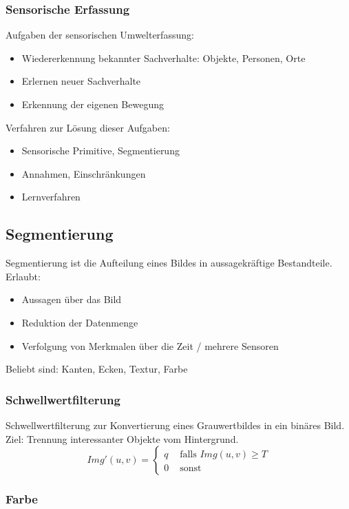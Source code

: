 \subsubsection*{Sensorische Erfassung}

Aufgaben der sensorischen Umwelterfassung:
\begin{itemize}
\item Wiedererkennung bekannter Sachverhalte: Objekte, Personen, Orte
\item Erlernen neuer Sachverhalte
\item Erkennung der eigenen Bewegung
\end{itemize}
Verfahren zur Lösung dieser Aufgaben:
\begin{itemize}
\item Sensorische Primitive, Segmentierung
\item Annahmen, Einschränkungen
\item Lernverfahren
\end{itemize}

\subsection{Segmentierung}

Segmentierung ist die Aufteilung eines Bildes in aussagekräftige Bestandteile. Erlaubt:
\begin{itemize}
\item Aussagen über das Bild
\item Reduktion der Datenmenge
\item Verfolgung von Merkmalen über die Zeit / mehrere Sensoren
\end{itemize}
Beliebt sind: Kanten, Ecken, Textur, Farbe

\subsubsection{Schwellwertfilterung}

Schwellwertfilterung zur Konvertierung eines Grauwertbildes in ein binäres Bild. Ziel: Trennung interessanter Objekte vom Hintergrund. $$Img'(u,v) = \left\{ \begin{array}{cl} q & \textrm{ falls } Img(u,v) \geq T \\ 0 & \textrm{ sonst} \end{array} \right.$$

\subsubsection{Farbe}


